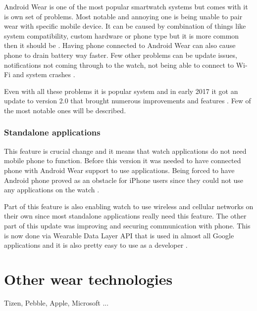 Android Wear is one of the most popular smartwatch systems but comes with it is own set of problems. Most notable and annoying one is being unable to pair wear with specific mobile device. It can be caused by combination of things like system compatibility, custom hardware or phone type but it is more common then it should be \cite{AWPaS}. Having phone connected to Android Wear can also cause phone to drain battery way faster. Few other problems can be update issues, notifications not coming through to the watch, not being able to connect to Wi-Fi and system crashes \cite{WAWP}.

Even with all these problems it is popular system and in early 2017 it got an update to version 2.0 that brought numerous improvements and features \cite{AW2UG}\cite{AW2WN}\cite{AW2N}. Few of the most notable ones will be described.

\subsubsection{Standalone applications}\label{sec:StandaloneApplications}
This feature is crucial change and it means that watch applications do not need mobile phone to function. Before this version it was needed to have connected phone with Android Wear support to use applications. Being forced to have Android phone proved as an obstacle for iPhone users since they could not use any applications on the watch \cite{AW2UG}\cite{AW2WN}.

Part of this feature is also enabling watch to use wireless and cellular networks on their own since most standalone applications really need this feature. The other part of this update was improving and securing communication with phone. This is now done via Wearable Data Layer API that is used in almost all Google applications and it is also pretty easy to use as a developer \cite{AW2UG}.



\section{Other wear technologies}\label{sec:OtherWearTechnologies}
Tizen, Pebble, Apple, Microsoft ...